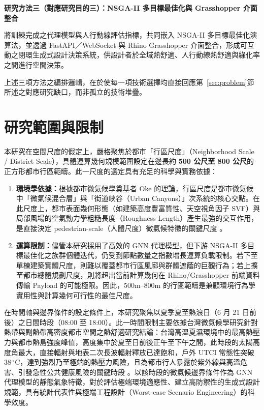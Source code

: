 \noindent\textbf{研究方法三（對應研究目的三）：NSGA-II 多目標最佳化與 Grasshopper 介面整合}

將訓練完成之代理模型與人行動線評估指標，共同嵌入 NSGA-II 多目標最佳化演算法，並透過 FastAPI／WebSocket \citep{rfc6455} 與 Rhino Grasshopper 介面整合，形成可互動之閉環生成式設計決策系統，供設計者於全域熱舒適、人行動線熱舒適與綠化率之間進行空間決策。

上述三項方法之編排邏輯，在於使每一項技術選擇均直接回應第~\ref{sec:problem}節所述之對應研究缺口，而非孤立的技術堆疊。


\section{研究範圍與限制}
\label{sec:scope}

本研究在空間尺度的假定上，嚴格聚焦於都市「行區尺度」（Neighborhood Scale / District Scale），具體運算幾何規模範圍設定在邊長約 \textbf{500 公尺至 800 公尺}的正方形都市行區範疇。此一尺度的選定具有充足的科學與實務依據：

\begin{enumerate}
    \item \textbf{環境學依據：}根據都市微氣候學奠基者 Oke 的理論，行區尺度是都市微氣候中「微氣候混合層」與「街道峽谷（Urban Canyons）」次系統的核心交點。在此尺度上，都市表面幾何形態（如建築高度豐富質性、天空視角因子 SVF）與局部風場的空氣動力學粗糙長度（Roughness Length）產生最強的交互作用，是直接決定 pedestrian-scale（人體尺度）微氣候特徵的關鍵尺度 \citep{oke1987boundary}。
    \item \textbf{運算限制：}儘管本研究採用了高效的 GNN 代理模型，但下游 NSGA-II 多目標最佳化之族群個體迭代，仍受到節點數量之指數增長運算負載限制。若下至單棟建築實體尺度，則難以覆蓋都市行區風廓與群體遮蔭的巨觀行為；若上擴至都市總體規劃尺度，則將超出當前計算幾何在 Rhino/Grasshopper 前端資料傳輸 Payload 的可能極限。因此，500m--800m 的行區範疇是兼顧環境行為學實用性與計算幾何可行性的最佳尺度。
\end{enumerate}

在時間軸與邊界條件的設定條件上，本研究聚焦以夏季夏至熱浪日（6 月 21 日前後）之日間時段（08:00 至 18:00）。此一時間限制主要依據台灣微氣候學研究針對熱帶與副熱帶高密度都市空間之熱舒適研究結論：台灣高溫夏濕環境中的最高熱壓力與都市熱島強度峰值，高度集中於夏至日前後正午至下午之間，此時段的太陽高度角最大，直接輻射與地表二次長波輻射釋放已達飽和，戶外 UTCI 常態性突破 $38\,^\circ\text{C}$，達到強烈乃至極端的熱壓力風險，且為都市行人暴露於紫外線與高溫危害、引發急性公共健康風險的關鍵時段 \citep{su2023outdoor}。以該時段的微氣候邊界條件作為 GNN 代理模型的靜態氣象特徵，對於評估極端環境適應性、建立高防禦性的生成式設計規範，具有統計代表性與極端工程設計（Worst-case Scenario Engineering）的科學效度。

